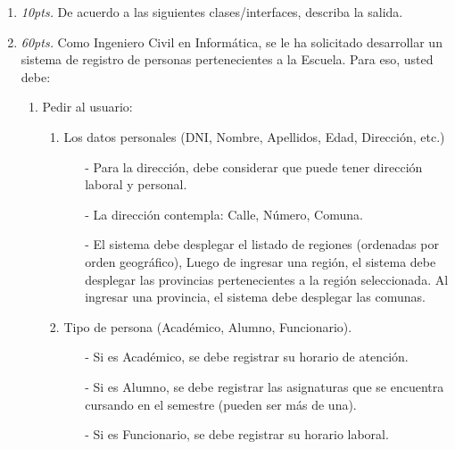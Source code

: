 \documentclass[10pt]{article}
\begin{document}
{\begin{enumerate}
\begin{multicols}{2}
		\end{multicols}
		
		\newpage

		\item \emph{10pts.} De acuerdo a las siguientes clases/interfaces, describa la salida.
		
		
		
		
		
		

        \newpage

        \item \emph{60pts.} Como Ingeniero Civil en Inform\'atica, se le ha solicitado desarrollar un sistema de registro de personas pertenecientes a la Escuela. Para eso, usted debe:
        \begin{enumerate}
            \item Pedir al usuario:
            \begin{enumerate}
                \item Los datos personales (DNI, Nombre, Apellidos, Edad, Direcci\'on, etc.)
                \begin{itemize}
                    \item[-] Para la direcci\'on, debe considerar que puede tener direcci\'on laboral y personal.
                    \item[-] La direcci\'on contempla: Calle, N\'umero, Comuna. 
                    \item[-] El sistema debe desplegar el listado de regiones (ordenadas por orden geogr\'afico), Luego de ingresar una regi\'on, el sistema debe desplegar las provincias pertenecientes a la regi\'on seleccionada. Al ingresar una provincia, el sistema debe desplegar las comunas.
                \end{itemize}
                \item Tipo de persona (Acad\'emico, Alumno, Funcionario).
                \begin{itemize}
                    \item[-] Si es Acad\'emico, se debe registrar su horario de atenci\'on.
                    \item[-] Si es Alumno, se debe registrar las asignaturas que se encuentra cursando en el semestre (pueden ser m\'as de una).
                    \item[-] Si es Funcionario, se debe registrar su horario laboral.

\end{itemize}
\end{enumerate}
\end{enumerate}
\end{enumerate}}
\end{document}
